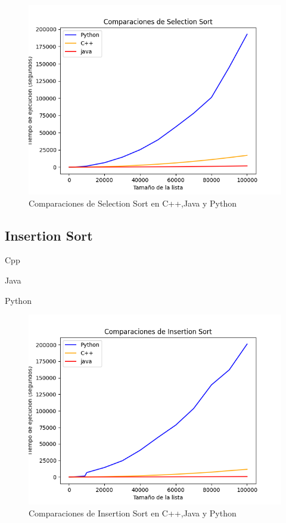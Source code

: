 \begin{figure}[h]
    \centering
    \includegraphics[scale=.60]{img/Selection Sort.png}
    \caption{Comparaciones de Selection Sort en C++,Java y Python}
    \label{fig:primera_figura}
\end{figure}

\subsection{Insertion Sort} 
Cpp

Java


\vspace{4cm}
Python


\begin{figure}[h]
    \centering
    \includegraphics[scale=.60]{img/Insertion sort.png}
    \caption{Comparaciones de Insertion Sort en C++,Java y Python}
    \label{fig:primera_figura}
\end{figure}

